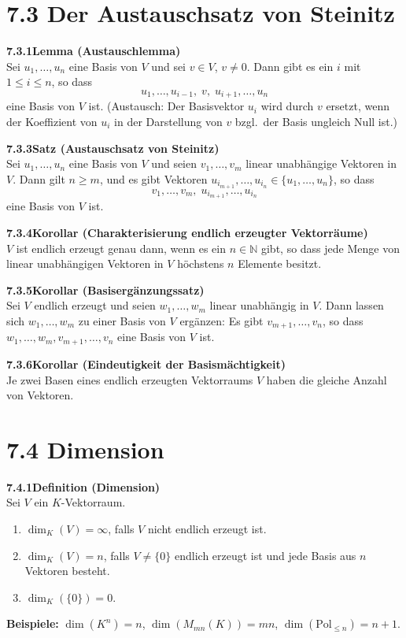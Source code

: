 \documentclass[a4paper,12pt]{article}
\newcommand{\gentry}[3]{%
  \noindent\textbf{#1\quad #2}\nopagebreak\\[0.2em]
  #3\par\smallskip
}
\begin{document}
\section*{7.3 \quad Der Austauschsatz von Steinitz}

\gentry{7.3.1}{Lemma (Austauschlemma)}{%
  Sei $u_1,\ldots,u_n$ eine Basis von $V$ und sei $v \in V$, $v \neq 0$. Dann
  gibt es ein $i$ mit $1 \le i \le n$, so dass
  \[
    u_1,\ldots,u_{i-1},\; v,\; u_{i+1},\ldots,u_n
  \]
  eine Basis von $V$ ist. (Austausch: Der Basisvektor $u_i$ wird durch $v$
  ersetzt, wenn der Koeffizient von $u_i$ in der Darstellung von $v$ bzgl.\ der
  Basis ungleich Null ist.)
}

\gentry{7.3.3}{Satz (Austauschsatz von Steinitz)}{%
  Sei $u_1,\ldots,u_n$ eine Basis von $V$ und seien $v_1,\ldots,v_m$ linear
  unabhängige Vektoren in $V$. Dann gilt $n \ge m$, und es gibt Vektoren
  $u_{i_{m+1}},\ldots,u_{i_n} \in \{u_1,\ldots,u_n\}$, so dass
  \[
    v_1,\ldots,v_m,\; u_{i_{m+1}},\ldots,u_{i_n}
  \]
  eine Basis von $V$ ist.
}

\gentry{7.3.4}{Korollar (Charakterisierung endlich erzeugter Vektorräume)}{%
  $V$ ist endlich erzeugt genau dann, wenn es ein $n \in \mathbb{N}$ gibt, so
  dass jede Menge von linear unabhängigen Vektoren in $V$ höchstens $n$
  Elemente besitzt.
}

\gentry{7.3.5}{Korollar (Basisergänzungssatz)}{%
  Sei $V$ endlich erzeugt und seien $w_1,\ldots,w_m$ linear unabhängig in $V$.
  Dann lassen sich $w_1,\ldots,w_m$ zu einer Basis von $V$ ergänzen: Es gibt
  $v_{m+1},\ldots,v_n$, so dass $w_1,\ldots,w_m,v_{m+1},\ldots,v_n$ eine Basis
  von $V$ ist.
}

\gentry{7.3.6}{Korollar (Eindeutigkeit der Basismächtigkeit)}{%
  Je zwei Basen eines endlich erzeugten Vektorraums $V$ haben die gleiche
  Anzahl von Vektoren.
}

\section*{7.4 \quad Dimension}

\gentry{7.4.1}{Definition (Dimension)}{%
  Sei $V$ ein $K$-Vektorraum.
  \begin{enumerate}[label=(\alph*),topsep=2pt,itemsep=1pt]
    \item $\dim_K(V) = \infty$, falls $V$ nicht endlich erzeugt ist.
    \item $\dim_K(V) = n$, falls $V \neq \{0\}$ endlich erzeugt ist und jede
          Basis aus $n$ Vektoren besteht.
    \item $\dim_K(\{0\}) = 0$.
  \end{enumerate}
  \textbf{Beispiele:} $\dim(K^n) = n$,\; $\dim(M_{mn}(K)) = mn$,\;
  $\dim(\text{Pol}_{\le n}) = n+1$.
}
\end{document}
